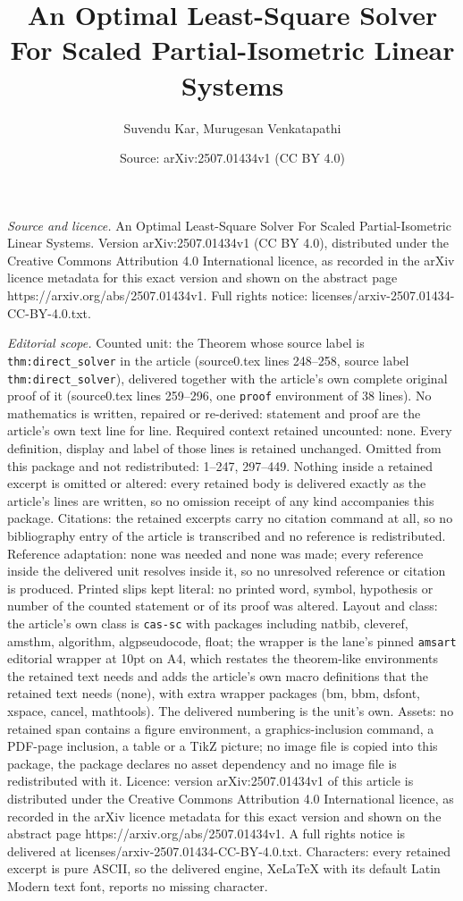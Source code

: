 \documentclass[10pt,a4paper]{amsart}
\title[An Optimal Least-Square Solver For Scaled Partial-Isometric ]{An Optimal Least-Square Solver For Scaled Partial-Isometric Linear Systems}
\author{Suvendu Kar, Murugesan Venkatapathi}
\date{Source: arXiv:2507.01434v1 (CC BY 4.0)}
\begin{document}
\maketitle

\noindent\emph{Source and licence.} An Optimal Least-Square Solver For Scaled Partial-Isometric Linear Systems. Version arXiv:2507.01434v1 (CC BY 4.0), distributed under the Creative Commons Attribution 4.0 International licence, as recorded in the arXiv licence metadata for this exact version and shown on the abstract page https://arxiv.org/abs/2507.01434v1. Full rights notice: licenses/arxiv-2507.01434-CC-BY-4.0.txt.\par\smallskip

\noindent\textit{Editorial scope.} Counted unit: the Theorem whose source label is \texttt{thm:direct\_solver} in the article (source0.tex lines 248--258, source label \texttt{thm:direct\_solver}), delivered together with the article's own complete original proof of it (source0.tex lines 259--296, one \texttt{proof} environment of 38 lines). No mathematics is written, repaired or re-derived: statement and proof are the article's own text line for line. Required context retained uncounted: none. Every definition, display and label of those lines is retained unchanged. Omitted from this package and not redistributed: 1--247, 297--449. Nothing inside a retained excerpt is omitted or altered: every retained body is delivered exactly as the article's lines are written, so no omission receipt of any kind accompanies this package. Citations: the retained excerpts carry no citation command at all, so no bibliography entry of the article is transcribed and no reference is redistributed. Reference adaptation: none was needed and none was made; every reference inside the delivered unit resolves inside it, so no unresolved reference or citation is produced. Printed slips kept literal: no printed word, symbol, hypothesis or number of the counted statement or of its proof was altered. Layout and class: the article's own class is \texttt{cas-sc} with packages including natbib, cleveref, amsthm, algorithm, algpseudocode, float; the wrapper is the lane's pinned \texttt{amsart} editorial wrapper at 10pt on A4, which restates the theorem-like environments the retained text needs and adds the article's own macro definitions that the retained text needs (none), with extra wrapper packages (bm, bbm, dsfont, xspace, cancel, mathtools). The delivered numbering is the unit's own. Assets: no retained span contains a figure environment, a graphics-inclusion command, a PDF-page inclusion, a table or a TikZ picture; no image file is copied into this package, the package declares no asset dependency and no image file is redistributed with it. Licence: version arXiv:2507.01434v1 of this article is distributed under the Creative Commons Attribution 4.0 International licence, as recorded in the arXiv licence metadata for this exact version and shown on the abstract page https://arxiv.org/abs/2507.01434v1. A full rights notice is delivered at licenses/arxiv-2507.01434-CC-BY-4.0.txt. Characters: every retained excerpt is pure ASCII, so the delivered engine, XeLaTeX with its default Latin Modern text font, reports no missing character.
\end{document}
